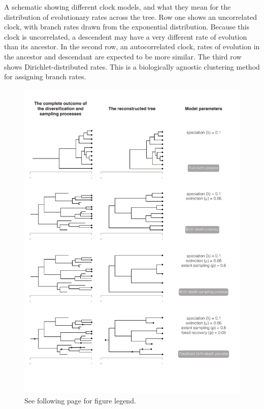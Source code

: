 \documentclass[11pt]{article}
\begin{document}
\caption{\footnotesize A schematic showing different clock models, and what they mean for the distribution of evolutionary rates across the tree. Row one shows an uncorrelated clock, with branch rates drawn from the exponential distribution. Because this clock is uncorrelated, a descendent may have a very different rate of evolution than its ancestor. In the second row, an autocorrelated clock, rates of evolution in the ancestor and descendant are expected to be more similar. The third row shows Dirichlet-distributed rates. This is a biologically agnostic clustering method for assigning branch rates.
}

\clearpage


\begin{figure}
\centering
\includegraphics[width=\textwidth]{figures/birth-death-trees-v2.pdf}
\caption{\footnotesize See following page for figure legend.
}
\label{fig:birth-death}
\end{figure}
\end{document}
